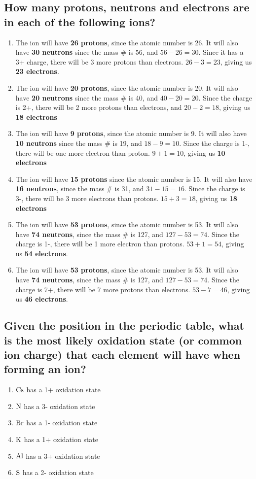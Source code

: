 \documentclass[11pt]{article}
\begin{document}
\subsection{How many protons, neutrons and electrons are in each of the following ions?}
\label{sec:org5d1a273}
\begin{enumerate}
\item The ion will have \textbf{26 protons}, since the atomic number is 26. It will also have \textbf{30 neutrons} since the mass \# is 56, and \(56-26=30\). Since it has a 3+ charge, there will be 3 more protons than electrons. \(26-3=23\), giving us \textbf{23 electrons}.
\item The ion will have \textbf{20 protons}, since the atomic number is 20. It will also have \textbf{20 neutrons} since the mass \# is 40, and \(40-20 = 20\). Since the charge is 2+, there will be 2 more protons than electrons, and \(20-2=18\), giving us \textbf{18 electrons}
\item The ion will have \textbf{9 protons}, since the atomic number is 9. It will also have \textbf{10 neutrons} since the mass \# is 19, and \(18-9=10\). Since the charge is 1-, there will be one more electron than proton. \(9+1=10\), giving us \textbf{10 electrons}
\item The ion will have \textbf{15 protons} since the atomic number is 15. It will also have \textbf{16 neutrons}, since the mass \# is 31, and \(31-15=16\). Since the charge is 3-, there will be 3 more electrons than protons. \(15+3=18\), giving us \textbf{18 electrons}
\item The ion will have \textbf{53 protons}, since the atomic number is 53. It will also have \textbf{74 neutrons}, since the mass \# is 127, and \(127-53=74\). Since the charge is 1-, there will be 1 more electron than protons. \(53+1=54\), giving us \textbf{54 electrons}.
\item The ion will have \textbf{53 protons}, since the atomic number is 53. It will also have \textbf{74 neutrons}, since the mass \# is 127, and \(127-53=74\). Since the charge is 7+, there will be 7 more protons than electrons. \(53-7=46\), giving us \textbf{46 electrons}.
\end{enumerate}

\subsection{Given the position in the periodic table, what is the most likely oxidation state (or common ion charge) that each element will have when forming an ion?}
\label{sec:org5a49496}
\begin{enumerate}
\item \(\ce{Cs}\) has a 1+ oxidation state
\item \(\ce{N}\) has a 3- oxidation state
\item \(\ce{Br}\) has a 1- oxidation state
\item \(\ce{K}\) has a 1+ oxidation state
\item \(\ce{Al}\) has a 3+ oxidation state
\item \(\ce{S}\) has a 2- oxidation state
\end{enumerate}
\end{document}
